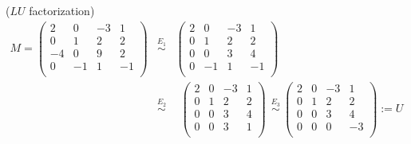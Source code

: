 \newpage
\begin{example} ($LU$ \hypertarget{elldeeeww}{ factorization})
\begin{eqnarray*}
M=
\begin{pmatrix}
2&0&-3&1\\
0&1&2&2\\
-4&0&9&2\\
0&-1&1&-1\\
\end{pmatrix}
&\stackrel{E_1}{\sim}&
\begin{pmatrix}
2&0&-3&1\\
0&1&2&2\\
0&0&3&4\\
0&-1&1&-1\\
\end{pmatrix}
\\
&\stackrel{E_2}{\sim}&
~~\begin{pmatrix}
2&0&-3&1\\
0&1&2&2\\
0&0&3&4\\
0&0&3&1\\
\end{pmatrix}
~~\stackrel{E_3}{\sim}~
\begin{pmatrix}
2&0&-3&1\\
0&1&2&2\\
0&0&3&4\\
0&0&0&-3\\
\end{pmatrix}
:=U
\end{eqnarray*}


\end{example}
